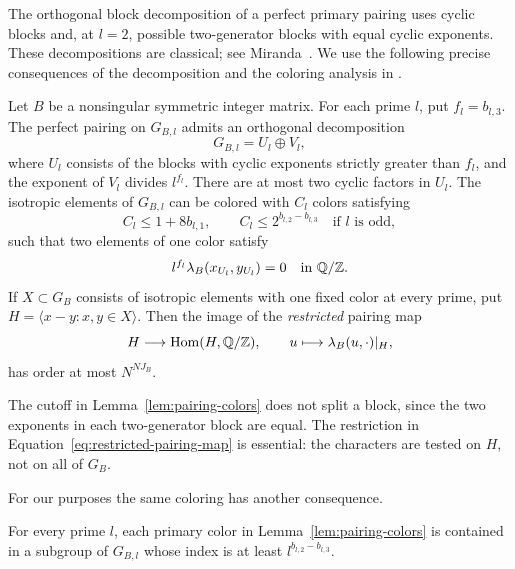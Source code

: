 The orthogonal block decomposition of a perfect primary pairing
uses cyclic blocks and, at \(l=2\), possible two-generator blocks
with equal cyclic exponents. These decompositions are classical;
see Miranda~\cite[Section~1]{Miranda}. We use the following precise
consequences of the decomposition and the coloring analysis in
\cite[Lemmas 6.1--6.3]{SymmetricRate}.

\begin{lemma}\label{lem:pairing-colors}
Let \(B\) be a nonsingular symmetric integer matrix. For each prime
\(l\), put \(f_l=b_{l,3}\). The perfect pairing on \(G_{B,l}\)
admits an orthogonal decomposition
\[
 G_{B,l}=U_l\oplus V_l,
\]
where \(U_l\) consists of the blocks with cyclic exponents strictly
greater than \(f_l\), and the exponent of \(V_l\) divides
\(l^{f_l}\). There are at most two cyclic factors in \(U_l\).
The isotropic elements of \(G_{B,l}\) can be colored with \(C_l\)
colors satisfying
\begin{equation}\label{eq:primary-color-count}
 C_l\le1+8b_{l,1},
 \qquad C_l\le2^{b_{l,2}-b_{l,3}}\quad\text{if \(l\) is odd},
\end{equation}
such that two elements of one color satisfy
\begin{equation}\label{eq:primary-color-pairing}
 l^{f_l}\lambda_B(x_{U_l},y_{U_l})=0
 \quad\text{in }\mathbb Q/\mathbb Z.
\end{equation}
If \(X\subset G_B\) consists of isotropic elements with one fixed
color at every prime, put \(H=\langle x-y:x,y\in X\rangle\).
Then the image of the \emph{restricted} pairing map
\begin{equation}\label{eq:restricted-pairing-map}
 H\longrightarrow\operatorname{Hom}(H,\mathbb Q/\mathbb Z),
 \qquad u\longmapsto\lambda_B(u,\cdot)|_H,
\end{equation}
has order at most \(N^{NJ_B}\).
\end{lemma}

The cutoff in Lemma~\ref{lem:pairing-colors} does not split a
block, since the two exponents in each two-generator block are equal.
The restriction in
Equation~\eqref{eq:restricted-pairing-map} is essential: the
characters are tested on \(H\), not on all of \(G_B\).

For our purposes the same coloring has another consequence.

\begin{lemma}\label{lem:color-subgroup}
For every prime \(l\), each primary color in
Lemma~\ref{lem:pairing-colors} is contained in a subgroup of
\(G_{B,l}\) whose index is at least
\(l^{b_{l,2}-b_{l,3}}\).
\end{lemma}

